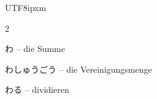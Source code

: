 \begin{CJK}{UTF8}{ipxm}
\begin{multicols}{2}
\par\nopagebreak
{} {\footnotesize\color{black!70}わ} -- die Summe\dotfill\hyperref[e:15]{\pageref*{e:15}}\par
{} {\footnotesize\color{black!70}わしゅうごう} -- die Vereinigungsmenge\dotfill\hyperref[e:101]{\pageref*{e:101}}\par
{} {\footnotesize\color{black!70}わる} -- dividieren\dotfill\hyperref[e:24]{\pageref*{e:24}}\par
\end{multicols}

\clearpage
\end{CJK}

